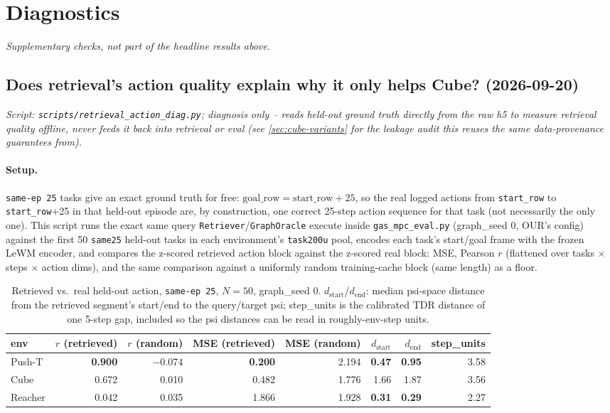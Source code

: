 \documentclass[11pt]{article}
\begin{document}
\section{Diagnostics}
\emph{Supplementary checks, not part of the headline results above.}

\subsection{Does retrieval's action quality explain why it only helps Cube? (2026-09-20)}
\label{sec:retrieval-action-diag}
\emph{Script: \texttt{scripts/retrieval\_action\_diag.py}; diagnosis only -- reads held-out
ground truth directly from the raw h5 to measure retrieval quality offline, never feeds it
back into retrieval or eval (see \cref{sec:cube-variants} for the leakage audit this reuses
the same data-provenance guarantees from).}

\paragraph{Setup.} \texttt{same-ep 25} tasks give an exact ground truth for free:
$\mathrm{goal\_row} = \mathrm{start\_row} + 25$, so the real logged actions from
\texttt{start\_row} to \texttt{start\_row}+25 in that held-out episode are, by construction,
one correct 25-step action sequence for that task (not necessarily the only one). This script
runs the exact same query \texttt{Retriever}/\texttt{GraphOracle} execute inside
\texttt{gas\_mpc\_eval.py} (graph\_seed 0, OUR's config) against the first 50 \texttt{same25}
held-out tasks in each environment's \texttt{task200u} pool, encodes each task's start/goal
frame with the frozen LeWM encoder, and compares the z-scored retrieved action block against
the z-scored real block: MSE, Pearson $r$ (flattened over tasks $\times$ steps $\times$ action
dims), and the same comparison against a uniformly random training-cache block (same length)
as a floor.

\begin{table}[H]
\centering\small
\caption{Retrieved vs.\ real held-out action, \texttt{same-ep 25}, $N=50$, graph\_seed 0.
$d_{\mathrm{start}}$/$d_{\mathrm{end}}$: median psi-space distance from the retrieved segment's
start/end to the query/target psi; step\_units is the calibrated TDR distance of one 5-step
gap, included so the psi distances can be read in roughly-env-step units.}
\label{tab:retrieval-action-diag}
\begin{tabular}{lrrrrrrr}
\toprule
env & $r$ (retrieved) & $r$ (random) & MSE (retrieved) & MSE (random) & $d_{\mathrm{start}}$ & $d_{\mathrm{end}}$ & step\_units \\
\midrule
Push-T  & \textbf{0.900} & $-0.074$ & \textbf{0.200} & 2.194 & \textbf{0.47} & \textbf{0.95} & 3.58 \\
Cube    & 0.672 & 0.010 & 0.482 & 1.776 & 1.66 & 1.87 & 3.56 \\
Reacher & 0.042 & 0.035 & 1.866 & 1.928 & \textbf{0.31} & \textbf{0.29} & 2.27 \\
\bottomrule
\end{tabular}
\end{table}
\end{document}
